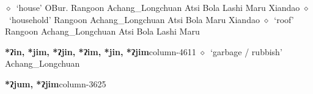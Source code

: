 \hspace{1ex}
         $\diamond$~`house'
         OBur. 
\hspace{1ex}
         Rangoon 
\hspace{1ex}
         Achang\_Longchuan 
\hspace{1ex}
         Atsi 
\hspace{1ex}
         Bola 
\hspace{1ex}
         Lashi 
\hspace{1ex}
         Maru 
\hspace{1ex}
         Xiandao 
\hspace{1ex}
         $\diamond$~`household'
         Rangoon 
\hspace{1ex}
         Achang\_Longchuan 
\hspace{1ex}
         Atsi 
\hspace{1ex}
         Bola 
\hspace{1ex}
         Maru 
\hspace{1ex}
         Xiandao 
\hspace{1ex}
         $\diamond$~`roof'
         Rangoon 
\hspace{1ex}
         Achang\_Longchuan 
\hspace{1ex}
         Atsi 
\hspace{1ex}
         Bola 
\hspace{1ex}
         Lashi 
\hspace{1ex}
         Maru 
  \item {\footnotesize \textbf{*ʔin, *jim, *ʔjin, *ʔim, *jin, *ʔjim}}{\tiny column-4611}
         $\diamond$~`garbage / rubbish'
         Achang\_Longchuan 
  \item {\footnotesize \textbf{*ʔjum, *ʔjim}}{\tiny column-3625}
